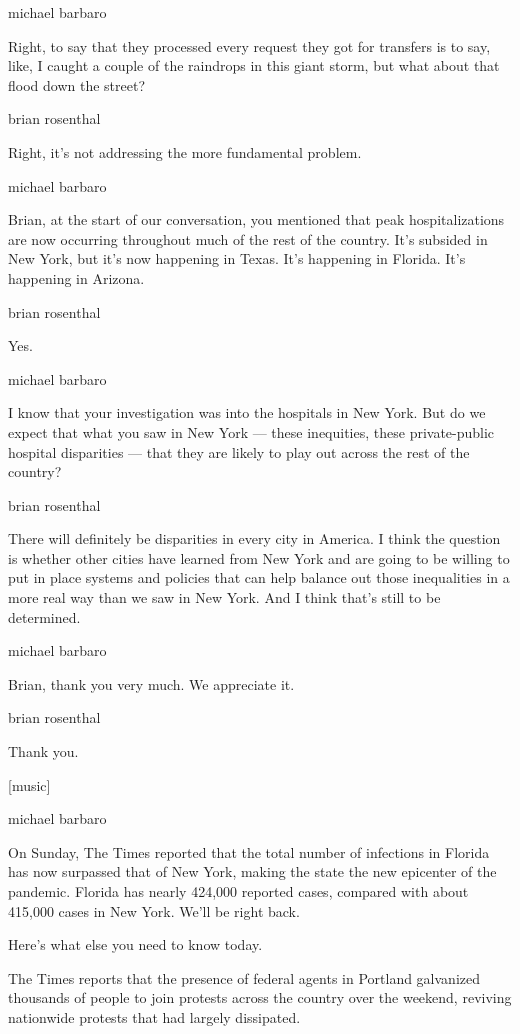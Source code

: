 michael barbaro

Right, to say that they processed every request they got for transfers
is to say, like, I caught a couple of the raindrops in this giant storm,
but what about that flood down the street?

brian rosenthal

Right, it's not addressing the more fundamental problem.

michael barbaro

Brian, at the start of our conversation, you mentioned that peak
hospitalizations are now occurring throughout much of the rest of the
country. It's subsided in New York, but it's now happening in Texas.
It's happening in Florida. It's happening in Arizona.

brian rosenthal

Yes.

michael barbaro

I know that your investigation was into the hospitals in New York. But
do we expect that what you saw in New York --- these inequities, these
private-public hospital disparities --- that they are likely to play out
across the rest of the country?

brian rosenthal

There will definitely be disparities in every city in America. I think
the question is whether other cities have learned from New York and are
going to be willing to put in place systems and policies that can help
balance out those inequalities in a more real way than we saw in New
York. And I think that's still to be determined.

michael barbaro

Brian, thank you very much. We appreciate it.

brian rosenthal

Thank you.

{[}music{]}

michael barbaro

On Sunday, The Times reported that the total number of infections in
Florida has now surpassed that of New York, making the state the new
epicenter of the pandemic. Florida has nearly 424,000 reported cases,
compared with about 415,000 cases in New York. We'll be right back.

Here's what else you need to know today.

The Times reports that the presence of federal agents in Portland
galvanized thousands of people to join protests across the country over
the weekend, reviving nationwide protests that had largely dissipated.

